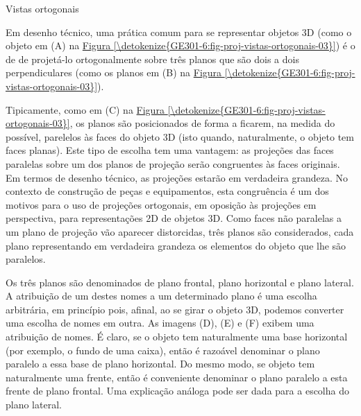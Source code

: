 \label{\detokenize{GE301-6:ativ-proj-vistas-ortogonais}}
\begin{task}{Vistas ortogonais}

Em desenho técnico, uma prática comum para se representar objetos 3D (como o objeto em (A) na \hyperref[\detokenize{GE301-6:fig-proj-vistas-ortogonais-03}]{Figura \ref{\detokenize{GE301-6:fig-proj-vistas-ortogonais-03}}}) é o de de projetá-lo ortogonalmente sobre três planos que são dois a dois perpendiculares (como os planos em (B) na \hyperref[\detokenize{GE301-6:fig-proj-vistas-ortogonais-03}]{Figura \ref{\detokenize{GE301-6:fig-proj-vistas-ortogonais-03}}}).

Tipicamente, como em (C) na \hyperref[\detokenize{GE301-6:fig-proj-vistas-ortogonais-03}]{Figura \ref{\detokenize{GE301-6:fig-proj-vistas-ortogonais-03}}}, os planos são posicionados de forma a ficarem, na medida do possível, parelelos às faces do objeto 3D (isto quando, naturalmente, o objeto tem faces planas). Este tipo de escolha tem uma vantagem: as projeções das faces paralelas sobre um dos planos de projeção serão congruentes às faces originais. Em termos de desenho técnico, as projeções estarão em verdadeira grandeza. No contexto de construção de peças e equipamentos, esta congruência é um dos motivos para o uso de projeções ortogonais, em oposição às projeções em perspectiva, para representações 2D de objetos 3D. Como faces não paralelas a um plano de projeção vão aparecer distorcidas, três planos são considerados, cada plano representando em verdadeira grandeza os elementos do objeto que lhe são paralelos.

Os três planos são denominados de plano frontal, plano horizontal e plano lateral. A atribuição de um destes nomes a um determinado plano é uma escolha arbitrária, em princípio pois, afinal, ao se girar o objeto 3D, podemos converter uma escolha de nomes em outra. As imagens (D), (E) e (F) exibem uma atribuição de nomes. É claro, se o objeto tem naturalmente uma base horizontal (por exemplo, o fundo de uma caixa), então é razoável denominar o plano paralelo a essa base de plano horizontal. Do mesmo modo, se objeto tem naturalmente uma frente, então é conveniente denominar o plano paralelo a esta frente de plano frontal. Uma explicação análoga pode ser dada para a escolha do plano lateral.
\label{\detokenize{GE301-6:fig-proj-vistas-ortogonais-03}}


\begin{figure}[H]
\centering


\end{figure}
\end{task}
